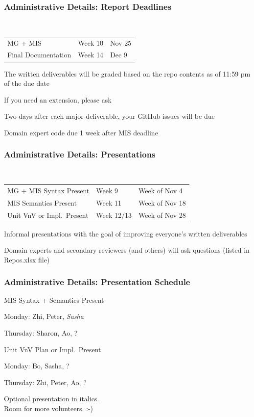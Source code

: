 \documentclass[t,12pt,numbers,fleqn]{beamer}
\begin{document}
\begin{frame}
\frametitle{Administrative Details: Report Deadlines}
~\newline
\begin{tabular}{l l l}
MG + MIS & Week 10 & Nov 25\\
Final Documentation & Week 14 & Dec 9\\
\end {tabular}

\bi
\item The written deliverables will be graded based on the repo contents as of
11:59 pm of the due date
\item If you need an extension, please ask
\item Two days after each major deliverable, your GitHub issues will be due
\item Domain expert code due 1 week after MIS deadline
\ei

\end{frame}


\begin{frame}
\frametitle{Administrative Details: Presentations}

~\newline
\begin{tabular}{l l l}
MG + MIS Syntax Present & Week 9 & Week of Nov 4\\
MIS Semantics Present & Week 11 & Week of Nov 18\\
Unit VnV or Impl.\ Present & Week 12/13 & Week of Nov 28\\
\end {tabular}

\bi
\item Informal presentations with the goal of improving everyone's written
  deliverables
\item Domain experts and secondary reviewers (and others) will ask questions
  (listed in Repos.xlsx file)
\ei

\end{frame}


\begin{frame}
\frametitle{Administrative Details: Presentation Schedule}

\bi
\item MIS Syntax + Semantics Present
\bi
\item Monday: Zhi, Peter, \emph{Sasha}
\item Thursday:  Sharon, Ao, ?
\ei
\item Unit VnV Plan or Impl.\ Present
\bi
\item Monday: Bo, Sasha, ?
\item Thursday: Zhi, Peter, Ao, ?
\ei
\ei

Optional presentation in italics.\\
Room for more volunteers.  :-)

\end{frame}
\end{document}
